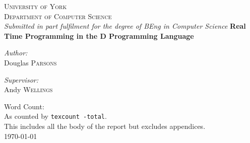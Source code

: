 \begin{titlepage}
\begin{center}


\textsc{\LARGE University of York}\\[1.5cm]

\textsc{\Large Department of Computer Science}\\[1.0cm]
\emph{Submitted in part fulfilment for the degree of BEng in Computer Science}
\HRule{\\[0.4cm]}
{\huge\bfseries{Real Time Programming in the D Programming Language}\\[0.4cm] }

\HRule{\\[1.5cm]}

\noindent
\begin{minipage}[t]{0.4\textwidth}
\begin{flushleft} \large
\emph{Author:}\\
Douglas \textsc{Parsons}
\end{flushleft}
\end{minipage}
\begin{minipage}[t]{0.4\textwidth}
\begin{flushright} \large
\emph{Supervisor:} \\
Andy \textsc{Wellings}
\end{flushright}
\end{minipage}

\vfill
 
{\small Word Count: \wordcount \\}
\vspace{5mm}
{\small As counted by \texttt{texcount -total}.}\\[0.5cm]
{\small This includes all the body of the report but excludes appendices.\\}
\vspace{15mm}
{\large \today}

\end{center}
\end{titlepage}
